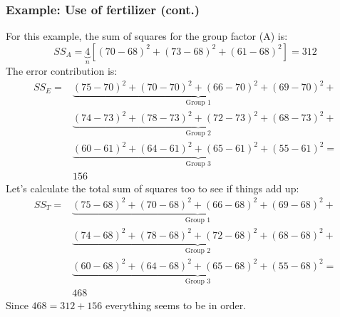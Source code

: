 \documentclass[12pt, a4paper]{article}
\begin{document}
\subsubsection{Example: Use of fertilizer (cont.)}
For this example, the sum of squares for the group factor (A) is:
\begin{equation}
SS_A=\underbrace{4}_{n}\left[(70-68)^2+(73-68)^2+(61-68)^2\right]=312
\end{equation}
The error contribution is:
\begin{align*}
SS_E = & \underbrace{(75-70)^2+(70-70)^2+(66-70)^2+(69-70)^2}_{\textrm{Group 1}} + \\
& \underbrace{(74-73)^2+(78-73)^2+(72-73)^2+(68-73)^2}_{\textrm{Group 2}} + \\
& \underbrace{(60-61)^2+(64-61)^2+(65-61)^2+(55-61)^2}_{\textrm{Group 3}} = \\
& 156
\end{align*}
Let's calculate the total sum of squares too to see if things add up:
\begin{align*}
SS_T = & \underbrace{(75-68)^2+(70-68)^2+(66-68)^2+(69-68)^2}_{\textrm{Group 1}} + \\
& \underbrace{(74-68)^2+(78-68)^2+(72-68)^2+(68-68)^2}_{\textrm{Group 2}} + \\
& \underbrace{(60-68)^2+(64-68)^2+(65-68)^2+(55-68)^2}_{\textrm{Group 3}} = \\
& 468
\end{align*}
Since $468=312+156$ everything seems to be in order.
\end{document}
